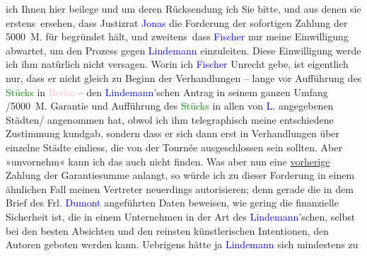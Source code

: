                ich Ihnen hier beilege und um deren Rücksendung ich Sie bitte, und aus denen sie
               erstens ersehen, dass Justizrat \textcolor{blue}{Jonas}{}\ledrightnote{\textcolor{blue}{Paul Jonas}} die
               Forderung der sofortigen Zahlung der 5000 M. für begründet hält, und zweitens dass
                  \textcolor{blue}{Fischer}{}\ledrightnote{\textcolor{blue}{Samuel Fischer}} nur meine Einwilligung abwartet, um
               den Prozess gegen \textcolor{blue}{Lindemann}{}\ledrightnote{\textcolor{blue}{Gustav Lindemann}} einzuleiten. Diese
               Einwilligung werde ich ihm natürlich nicht versagen.\pend
           \pstart
           Worin ich \textcolor{blue}{Fischer}{}\ledrightnote{\textcolor{blue}{Samuel Fischer}} Unrecht gebe, ist eigentlich
               nur, dass er nicht gleich zu Beginn der Verhandlungen – lange vor Aufführung des \textcolor{green}{Stücks}{} in \textcolor{pink}{Berlin}{}\ledrightnote{\textcolor{pink}{Berlin}} – den \textcolor{blue}{Lindemann}{}\ledrightnote{\textcolor{blue}{Gustav Lindemann}}’schen
               Antrag in seinem ganzen Umfang /5000 M. Garantie und Aufführung des \textcolor{green}{Stücks}{} in allen von \textcolor{blue}{L.}{}\ledrightnote{\textcolor{blue}{Gustav Lindemann}} angegebenen Städten/ angenommen hat, obwol ich ihm
               telegraphisch meine entschiedene Zustimmung kundgab, sondern dass er sich dann erst
               in Verhandlungen über einzelne Städte einliess, die von der Tournée ausgeschlossen
               sein sollte\introOben{}n\introOben{}. Aber \introOben{}»\introOben{}unvornehm\introOben{}«\introOben{} kann ich das auch nicht finden.\pend
           \pstart
           {\pb}Was aber nun eine \uline{vorherige} Zahlung der Garantiesumme anlangt, so würde ich zu dieser
               Forderung in einem ähnlichen Fall meinen Vertreter neuerdings autorisieren; denn
               gerade die in dem Brief des Frl. \textcolor{blue}{Dumont}{}\ledrightnote{\textcolor{blue}{Louise Dumont}}
               angeführten Daten beweisen, wie gering die finanzielle Sicherheit ist, die in einem
               Unternehmen in der Art des \textcolor{blue}{Lindemann}{}\ledrightnote{\textcolor{blue}{Gustav Lindemann}}’schen,
               selbst bei den besten Absichten und den reinsten künstlerischen Intentionen, den
               Autoren geboten werden kann.\pend
           \pstart
           Uebrigens hätte ja \textcolor{blue}{Lindemann}{}\ledrightnote{\textcolor{blue}{Gustav Lindemann}} sich mindestens zu
